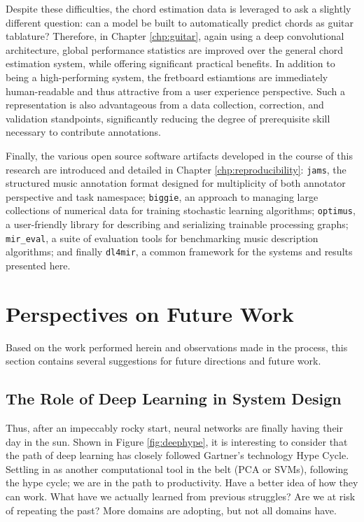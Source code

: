 Despite these difficulties, the chord estimation data is leveraged to ask a slightly different question: can a model be built to automatically predict chords as guitar tablature?
Therefore, in Chapter \ref{chp:guitar}, again using a deep convolutional architecture, global performance statistics are improved over the general chord estimation system, while offering significant practical benefits.
In addition to being a high-performing system, the fretboard estiamtions are immediately human-readable and thus attractive from a user experience perspective.
Such a representation is also advantageous from a data collection, correction, and validation standpoints, significantly reducing the degree of prerequisite skill necessary to contribute annotations.

Finally, the various open source software artifacts developed in the course of this research are introduced and detailed in Chapter \ref{chp:reproducibility}:
\texttt{jams}, the structured music annotation format designed for multiplicity of both annotator perspective and task namespace;
\texttt{biggie}, an approach to managing large collections of numerical data for training stochastic learning algorithms;
\texttt{optimus}, a user-friendly library for describing and serializing trainable processing graphs;
\texttt{mir\_eval}, a suite of evaluation tools for benchmarking music description algorithms;
and finally \texttt{dl4mir}, a common framework for the systems and results presented here.


\section{Perspectives on Future Work}
\label{sec:future}

Based on the work performed herein and observations made in the process, this section contains several suggestions for future directions and future work.


\subsection{The Role of Deep Learning in System Design}

Thus, after an impeccably rocky start, neural networks are finally having their day in the sun.
Shown in Figure \ref{fig:deephype}, it is interesting to consider that the path of deep learning has closely followed Gartner's technology Hype Cycle.
Settling in as another computational tool in the belt (PCA or SVMs), following the hype cycle; we are in the path to productivity.
Have a better idea of how they can work.
What have we actually learned from previous struggles? Are we at risk of repeating the past?
More domains are adopting, but not all domains have.

